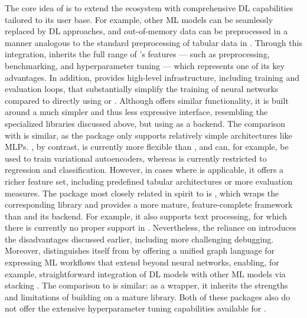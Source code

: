 \documentclass[article]{jss}
\theoremstyle{definition}
\begin{document}
The core idea of \mlrttorch{} is to extend the \mlrt{} ecosystem with comprehensive DL capabilities tailored to its user base.
For example, other ML models can be seamlessly replaced by DL approaches, and out-of-memory data can be preprocessed in a manner analogous to the standard preprocessing of tabular data in \mlrt{}.
Through this integration, \mlrttorch{} inherits the full range of \mlrt{}’s features — such as preprocessing, benchmarking, and hyperparameter tuning \citep{ref-mlr3tuning2024} — which represents one of its key advantages.
In addition, \mlrttorch{} provides high-level infrastructure, including training and evaluation loops, that substantially simplify the training of neural networks compared to directly using  or .
Although  offers similar functionality, it is built around a much simpler and thus less expressive interface, resembling the specialized libraries discussed above, but using  as a backend.
The comparison with  is similar, as the package only supports relatively simple architectures like MLPs.
, by contrast, is currently more flexible than \mlrttorch{}, and can, for example, be used to train variational autoencoders, whereas \mlrttorch{} is currently restricted to regression and classification.
However, in cases where \mlrttorch{} is applicable, it offers a richer feature set, including predefined tabular architectures or more evaluation measures.
The package most closely related in spirit to \mlrttorch{} is , which wraps the corresponding \python{} library and provides a more mature, feature-complete framework than \mlrttorch{} and its \torch{} backend.
For example, it also supports text processing, for which there is currently no proper support in \mlrttorch{}.
Nevertheless, the reliance on \python{} introduces the disadvantages discussed earlier, including more challenging debugging.
Moreover, \mlrttorch{} distinguishes itself from  by offering a unified graph language for expressing ML workflows that extend beyond neural networks, enabling, for example, straightforward integration of DL models with other ML models via stacking \citep{ref-mlr3book-chap8}.
The comparison to  is similar: as a \python{} wrapper, it inherits the strengths and limitations of building on a mature \python{} library.
Both of these packages also do not offer the extensive hyperparameter tuning capabilities available for \mlrttorch{}.
\end{document}
